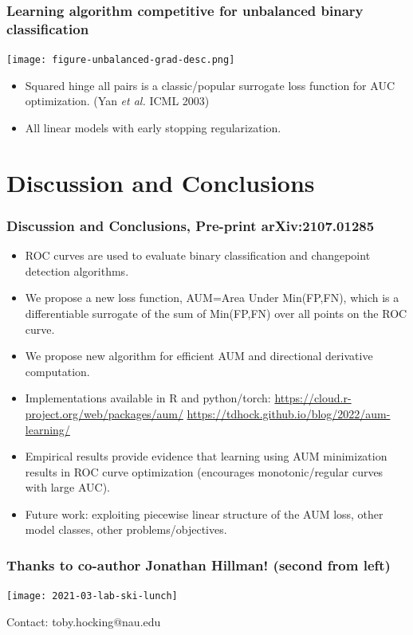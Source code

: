 \documentclass[t]{beamer}
\begin{document}
\begin{frame}
  \frametitle{Learning algorithm competitive for unbalanced binary classification}

 \texttt{[image: figure-unbalanced-grad-desc.png]}

 \begin{itemize}
 \item Squared hinge all pairs is a classic/popular surrogate loss function
   for AUC optimization. (Yan \emph{et al.} ICML 2003)
 \item All linear models with early stopping regularization.
 \end{itemize}

\end{frame}

\section{Discussion and Conclusions}

\begin{frame}
  \frametitle{Discussion and Conclusions, Pre-print arXiv:2107.01285}
  \begin{itemize}
  \item ROC curves are used to evaluate binary classification and
    changepoint detection algorithms.
  \item We propose a new loss function, AUM=Area Under Min(FP,FN),
    which is a differentiable surrogate of the sum of Min(FP,FN) over
    all points on the ROC curve.
  \item We propose new algorithm for efficient AUM and directional
    derivative computation.
  \item Implementations available in R and python/torch:
    \url{https://cloud.r-project.org/web/packages/aum/}
    \url{https://tdhock.github.io/blog/2022/aum-learning/}
  \item Empirical results provide evidence that learning using AUM
    minimization results in ROC curve optimization (encourages
    monotonic/regular curves with large AUC).
  \item Future work: exploiting piecewise linear structure of the AUM
    loss, other model classes, other problems/objectives.
  \end{itemize}
\end{frame}

\begin{frame}
  \frametitle{Thanks to co-author Jonathan Hillman! (second from left)}

  \texttt{[image: 2021-03-lab-ski-lunch]} 

  Contact: toby.hocking@nau.edu

\end{frame} 
\end{document}

